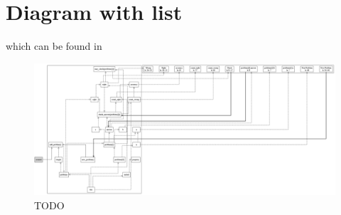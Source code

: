 \section{Diagram with list}
which can be found in 
\begin{figure}[H]
    \includegraphics[width=\textwidth]{images/diagram_list.png}
     \caption{TODO}
     \label{fig:diagram_list}
\end{figure}



